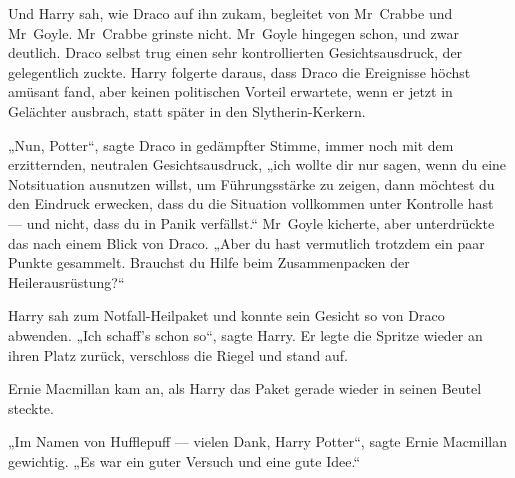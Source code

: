Und Harry sah, wie Draco auf ihn zukam, begleitet von Mr~Crabbe und Mr~Goyle. Mr~Crabbe grinste nicht. Mr~Goyle hingegen schon, und zwar deutlich. Draco selbst trug einen sehr kontrollierten Gesichtsausdruck, der gelegentlich zuckte. Harry folgerte daraus, dass Draco die Ereignisse höchst amüsant fand, aber keinen politischen Vorteil erwartete, wenn er jetzt in Gelächter ausbrach, statt später in den Slytherin-Kerkern.

„Nun, Potter“, sagte Draco in gedämpfter Stimme, immer noch mit dem erzitternden, neutralen Gesichtsausdruck, „ich wollte dir nur sagen, wenn du eine Notsituation ausnutzen willst, um Führungsstärke zu zeigen, dann möchtest du den Eindruck erwecken, dass du die Situation vollkommen unter Kontrolle hast — und nicht, dass du in Panik verfällst.“ Mr~Goyle kicherte, aber unterdrückte das nach einem Blick von Draco.
„Aber du hast vermutlich trotzdem ein paar Punkte gesammelt. Brauchst du Hilfe beim Zusammenpacken der Heilerausrüstung?“

Harry sah zum Notfall-Heilpaket und konnte sein Gesicht so von Draco abwenden.
„Ich schaff’s schon so“, sagte Harry. Er legte die Spritze wieder an ihren Platz zurück, verschloss die Riegel und stand auf.

Ernie Macmillan kam an, als Harry das Paket gerade wieder in seinen Beutel steckte.

„Im Namen von Hufflepuff — vielen Dank, Harry Potter“, sagte Ernie Macmillan gewichtig.
„Es war ein guter Versuch und eine gute Idee.“

